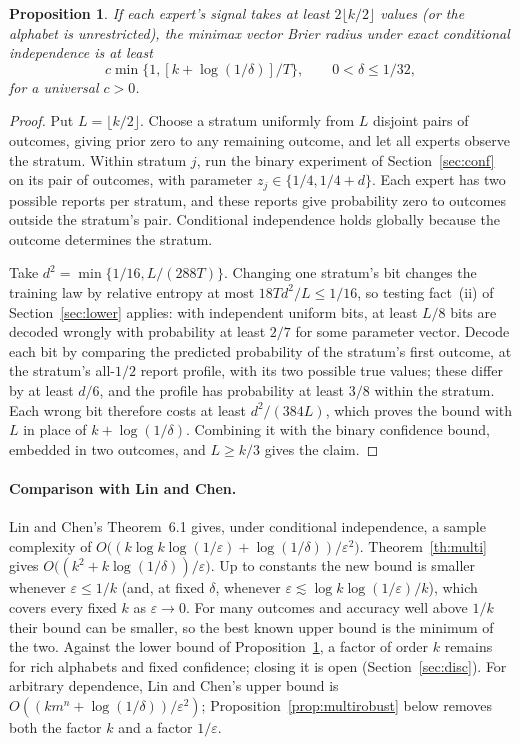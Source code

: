 \documentclass[11pt,a4paper]{article}
\newtheorem{proposition}[theorem]{Proposition}
\theoremstyle{remark}
\newcommand{\eps}{\varepsilon}
\begin{document}
\begin{proposition}\label{prop:multilower}
If each expert's signal takes at least $2\lfloor k/2\rfloor$ values (or the alphabet is unrestricted), the minimax vector Brier radius under exact conditional independence is at least
\[
 c\min\{1,[k+\log(1/\delta)]/T\},\qquad 0<\delta\le1/32,
\]
for a universal $c>0$.
\end{proposition}
\begin{proof}
Put $L=\lfloor k/2\rfloor$. Choose a stratum uniformly from $L$ disjoint pairs of outcomes, giving prior zero to any remaining outcome, and let all experts observe the stratum. Within stratum $j$, run the binary experiment of Section~\ref{sec:conf} on its pair of outcomes, with parameter $z_j\in\{1/4,1/4+d\}$. Each expert has two possible reports per stratum, and these reports give probability zero to outcomes outside the stratum's pair. Conditional independence holds globally because the outcome determines the stratum.

Take $d^2=\min\{1/16,L/(288T)\}$. Changing one stratum's bit changes the training law by relative entropy at most $18Td^2/L\le1/16$, so testing fact~(ii) of Section~\ref{sec:lower} applies: with independent uniform bits, at least $L/8$ bits are decoded wrongly with probability at least $2/7$ for some parameter vector. Decode each bit by comparing the predicted probability of the stratum's first outcome, at the stratum's all-$1/2$ report profile, with its two possible true values; these differ by at least $d/6$, and the profile has probability at least $3/8$ within the stratum. Each wrong bit therefore costs at least $d^2/(384L)$, which proves the bound with $L$ in place of $k+\log(1/\delta)$. Combining it with the binary confidence bound, embedded in two outcomes, and $L\ge k/3$ gives the claim.
\end{proof}

\paragraph{Comparison with Lin and Chen.} Lin and Chen's Theorem~6.1 gives, under conditional independence, a sample complexity of $O\big((k\log k\log(1/\eps)+\log(1/\delta))/\eps^2\big)$. Theorem~\ref{th:multi} gives $O\big((k^2+k\log(1/\delta))/\eps\big)$. Up to constants the new bound is smaller whenever $\eps\le1/k$ (and, at fixed $\delta$, whenever $\eps\lesssim\log k\log(1/\eps)/k$), which covers every fixed $k$ as $\eps\to0$. For many outcomes and accuracy well above $1/k$ their bound can be smaller, so the best known upper bound is the minimum of the two. Against the lower bound of Proposition~\ref{prop:multilower}, a factor of order $k$ remains for rich alphabets and fixed confidence; closing it is open (Section~\ref{sec:disc}). For arbitrary dependence, Lin and Chen's upper bound is $O((km^n+\log(1/\delta))/\eps^2)$; Proposition~\ref{prop:multirobust} below removes both the factor $k$ and a factor $1/\eps$.
\end{document}
